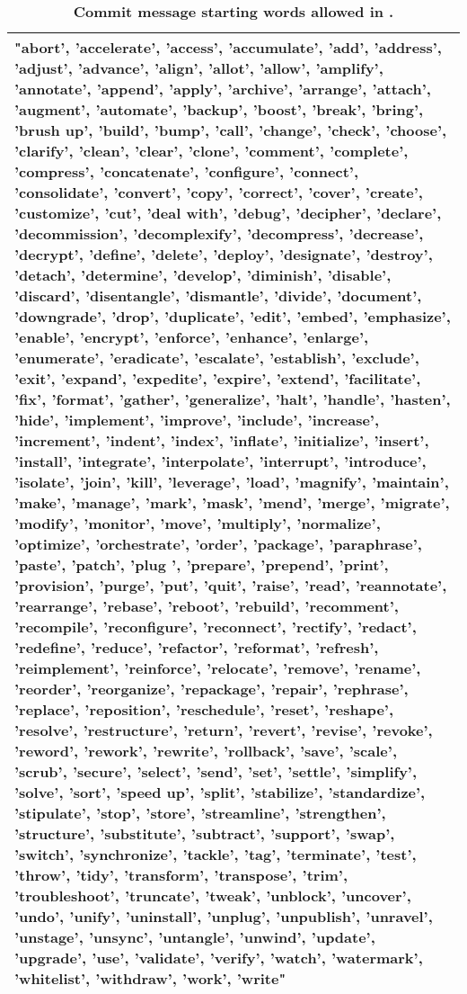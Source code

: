 \begin{table}[htbp]
\begin{tabular}{p{13cm}}
"abort', 'accelerate', 'access', 'accumulate', 'add', 'address', 'adjust', 'advance', 'align', 'allot', 'allow', 'amplify', 'annotate', 'append', 'apply', 'archive', 'arrange', 'attach', 'augment', 'automate', 'backup', 'boost', 'break', 'bring', 'brush up', 'build', 'bump', 'call', 'change', 'check', 'choose', 'clarify', 'clean', 'clear', 'clone', 'comment', 'complete', 'compress', 'concatenate', 'configure', 'connect', 'consolidate', 'convert', 'copy', 'correct', 'cover', 'create', 'customize', 'cut', 'deal with', 'debug', 'decipher', 'declare', 'decommission', 'decomplexify', 'decompress', 'decrease', 'decrypt', 'define', 'delete', 'deploy', 'designate', 'destroy', 'detach', 'determine', 'develop', 'diminish', 'disable', 'discard', 'disentangle', 'dismantle', 'divide', 'document', 'downgrade', 'drop', 'duplicate', 'edit', 'embed', 'emphasize', 'enable', 'encrypt', 'enforce', 'enhance', 'enlarge', 'enumerate', 'eradicate', 'escalate', 'establish', 'exclude', 'exit', 'expand', 'expedite', 'expire', 'extend', 'facilitate', 'fix', 'format', 'gather', 'generalize', 'halt', 'handle', 'hasten', 'hide', 'implement', 'improve', 'include', 'increase', 'increment', 'indent', 'index', 'inflate', 'initialize', 'insert', 'install', 'integrate', 'interpolate', 'interrupt', 'introduce', 'isolate', 'join', 'kill', 'leverage', 'load', 'magnify', 'maintain', 'make', 'manage', 'mark', 'mask', 'mend', 'merge', 'migrate', 'modify', 'monitor', 'move', 'multiply', 'normalize', 'optimize', 'orchestrate', 'order', 'package', 'paraphrase', 'paste', 'patch', 'plug ', 'prepare', 'prepend', 'print', 'provision', 'purge', 'put', 'quit', 'raise', 'read', 'reannotate', 'rearrange', 'rebase', 'reboot', 'rebuild', 'recomment', 'recompile', 'reconfigure', 'reconnect', 'rectify', 'redact', 'redefine', 'reduce', 'refactor', 'reformat', 'refresh', 'reimplement', 'reinforce', 'relocate', 'remove', 'rename', 'reorder', 'reorganize', 'repackage', 'repair', 'rephrase', 'replace', 'reposition', 'reschedule', 'reset', 'reshape', 'resolve', 'restructure', 'return', 'revert', 'revise', 'revoke', 'reword', 'rework', 'rewrite', 'rollback', 'save', 'scale', 'scrub', 'secure', 'select', 'send', 'set', 'settle', 'simplify', 'solve', 'sort', 'speed up', 'split', 'stabilize', 'standardize', 'stipulate', 'stop', 'store', 'streamline', 'strengthen', 'structure', 'substitute', 'subtract', 'support', 'swap', 'switch', 'synchronize', 'tackle', 'tag', 'terminate', 'test', 'throw', 'tidy', 'transform', 'transpose', 'trim', 'troubleshoot', 'truncate', 'tweak', 'unblock', 'uncover', 'undo', 'unify', 'uninstall', 'unplug', 'unpublish', 'unravel', 'unstage', 'unsync', 'untangle', 'unwind', 'update', 'upgrade', 'use', 'validate', 'verify', 'watch', 'watermark', 'whitelist', 'withdraw', 'work', 'write" \\
\bottomrule
\end{tabular}
\caption{\textbf{Commit message starting words allowed in \dataft{}.}}
\label{tab:filterwords}
\end{table}

